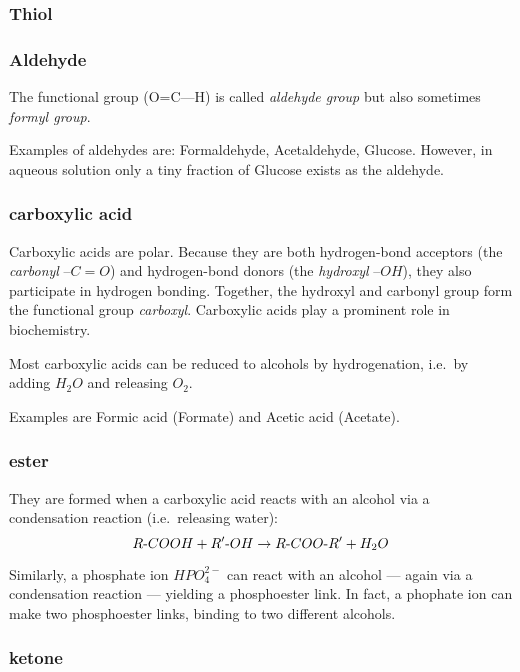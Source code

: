 \documentclass[a4paper,14pt]{extarticle}
\def\mhyphen{{\hbox{-}}}
\begin{document}
\subsubsection{Thiol}

\subsubsection{Aldehyde}


The functional group (O=C---H) is called {\em aldehyde group\/} but also sometimes {\em
formyl group}.

Examples of aldehydes are: Formaldehyde, Acetaldehyde, Glucose. However, in aqueous
solution only a tiny fraction of Glucose exists as the aldehyde.

\subsubsection{carboxylic acid}

Carboxylic acids are polar. Because they are both hydrogen-bond acceptors (the {\em
carbonyl\/} $–C=O$) and hydrogen-bond donors (the {\em hydroxyl\/} $–OH$), they also
participate in hydrogen bonding. Together, the hydroxyl and carbonyl group form the
functional group {\em carboxyl}.
Carboxylic acids play a prominent role in biochemistry.

Most carboxylic acids can be reduced to alcohols by hydrogenation, i.e.\ by adding
$H_2O$ and releasing $O_2$.

Examples are Formic acid (Formate) and Acetic acid (Acetate).

\subsubsection{ester}

They are formed when a carboxylic acid reacts with an alcohol via a condensation reaction
(i.e.\ releasing water):
\[
    R{\mhyphen}COOH + R'{\mhyphen}OH \rightarrow R{\mhyphen}COO{\mhyphen}R' + H_2O
\]

Similarly, a phosphate ion $HPO_4^{2-}$ can react with an alcohol --- again via a
condensation reaction --- yielding a phosphoester link. In fact, a
phophate ion can make two phosphoester links, binding to two different alcohols.

\subsubsection{ketone}
\end{document}
